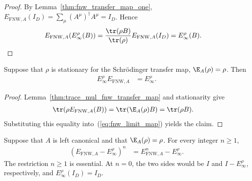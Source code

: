 \begin{proof}
    \leanok
    By Lemma~\ref{thm:fnw_transfer_map_one},
    $E_{\mathrm{FNW},A}(I_D)=\sum_\mu(A^\mu)^\dagger A^\mu=I_D$.
    Hence
    \begin{align}
        E_{\mathrm{FNW},A}\!\left(E_\infty^\rho(B)\right)
         & =\frac{\tr(\rho B)}{\tr(\rho)}E_{\mathrm{FNW},A}(I_D)
        =E_\infty^\rho(B).
    \end{align}
\end{proof}

\begin{lemma}
    \label{thm:fnw_limit_absorbs_transfer}
    \leanok
    Suppose that $\rho$ is stationary for the Schrödinger transfer map,
    $\E_A(\rho)=\rho$. Then
    \begin{align}
        E_\infty^\rho E_{\mathrm{FNW},A} & =E_\infty^\rho.
        \label{eq:fnw_limit_absorbs_transfer}
    \end{align}
\end{lemma}

\begin{proof}
    \leanok
    Lemma~\ref{thm:trace_mul_fnw_transfer_map} and stationarity give
    \begin{align}
        \tr\!\left(\rho E_{\mathrm{FNW},A}(B)\right)
         & =\tr\!\left(\E_A(\rho)B\right)=\tr(\rho B).
    \end{align}
    Substituting this equality into~(\ref{eq:fnw_limit_map}) yields the claim.
\end{proof}

\begin{lemma}
    \label{thm:fnw_remainder_power}
    \leanok
    Suppose that $A$ is left canonical and that
    $\E_A(\rho)=\rho$. For every integer $n\geq1$,
    \begin{align}
        (E_{\mathrm{FNW},A}-E_\infty^\rho)^n
         & =E_{\mathrm{FNW},A}^n-E_\infty^\rho.
        \label{eq:fnw_remainder_power}
    \end{align}
    The restriction $n\geq1$ is essential. At $n=0$, the two sides would be
    $I$ and $I-E_\infty^\rho$, respectively, and
    $E_\infty^\rho(I_D)=I_D$.
\end{lemma}

